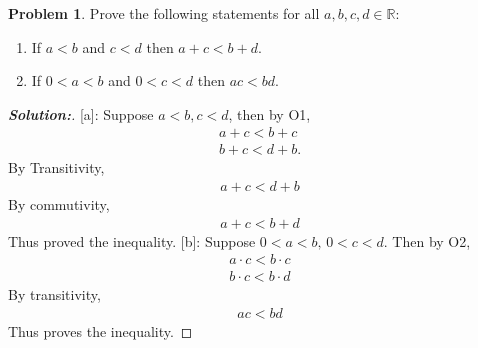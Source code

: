 \documentclass[12pt]{article}
\theoremstyle{definition}\newtheorem{problem}{Problem}
\newenvironment{solution}{\begin{proof}[\bfseries\textup{Solution:}]}{\end{proof}}
\begin{document}
\newpage
\begin{problem}
Prove the following statements for all $a,b,c,d\in\mathbb{R}$:
\begin{enumerate}
\item If $a<b$ and $c<d$ then $a+c < b+d$.
\item If $0<a<b$ and $0<c<d$ then $ac<bd$.
\end{enumerate}
\end{problem}
\begin{solution}

[a]:
Suppose $ a < b, c < d $, then by O1, \begin{align} 
    a + c < b + c \\
    b + c < d + b .
\end{align}
 By Transitivity, \begin{align} 
     a + c < d + b 
 \end{align}
 By commutivity, \begin{align} 
     a + c < b + d
    \end{align}
Thus proved the inequality.
[b]: Suppose $ 0 < a < b, \, 0<c<d $. Then by O2, \begin{align} 
    a \cdot c < b \cdot c \\
    b \cdot c < b \cdot d 
\end{align}
 By transitivity, \begin{align} 
     a  c < b  d
    \end{align}
    Thus proves the inequality.
\end{solution}
\end{document}
